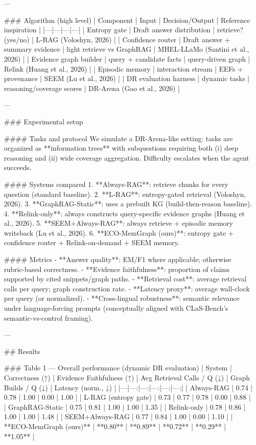 ---

### Algorithm (high level)
| Component | Input | Decision/Output | Reference inspiration |
|---|---|---|---|
| Entropy gate | Draft answer distribution | retrieve? (yes/no) | L-RAG (Voloshyn, 2026) |
| Confidence router | Draft answer + summary evidence | light retrieve vs GraphRAG | MHEL-LLaMo (Santini et al., 2026) |
| Evidence graph builder | query + candidate facts | query-driven graph | Relink (Huang et al., 2026) |
| Episodic memory | interaction stream | EEFs + provenance | SEEM (Lu et al., 2026) |
| DR evaluation harness | dynamic tasks | reasoning/coverage scores | DR-Arena (Gao et al., 2026) |

---

### Experimental setup  

#### Tasks and protocol  
We simulate a DR-Arena-like setting: tasks are organized as **information trees** with subquestions requiring both (i) deep reasoning and (ii) wide coverage aggregation. Difficulty escalates when the agent succeeds.

#### Systems compared  
1. **Always-RAG**: retrieve chunks for every question (standard baseline).  
2. **L-RAG**: entropy-gated retrieval (Voloshyn, 2026).  
3. **GraphRAG-Static**: uses a prebuilt KG (build-then-reason baseline).  
4. **Relink-only**: always constructs query-specific evidence graphs (Huang et al., 2026).  
5. **SEEM+Always-RAG**: always retrieve + episodic memory writeback (Lu et al., 2026).  
6. **ECO-MemGraph (ours)**: entropy gate + confidence router + Relink-on-demand + SEEM memory.

#### Metrics  
- **Answer quality**: EM/F1 where applicable; otherwise rubric-based correctness.  
- **Evidence faithfulness**: proportion of claims supported by cited snippets/graph paths.  
- **Retrieval cost**: average retrieval calls per query; graph construction rate.  
- **Latency proxy**: average wall-clock per query (or normalized).  
- **Cross-lingual robustness**: semantic relevance under language-forcing prompts (conceptually aligned with CLaS-Bench’s semantic-vs-control framing).

---

## Results  

### Table 1 — Overall performance (dynamic DR evaluation)
| System | Correctness (↑) | Evidence Faithfulness (↑) | Avg Retrieval Calls / Q (↓) | Graph Builds / Q (↓) | Latency (norm., ↓) |
|---|---:|---:|---:|---:|---:|
| Always-RAG | 0.74 | 0.78 | 1.00 | 0.00 | 1.00 |
| L-RAG (entropy gate) | 0.73 | 0.77 | 0.78 | 0.00 | 0.88 |
| GraphRAG-Static | 0.75 | 0.81 | 1.00 | 1.00 | 1.35 |
| Relink-only | 0.78 | 0.86 | 1.00 | 1.00 | 1.48 |
| SEEM+Always-RAG | 0.77 | 0.84 | 1.00 | 0.00 | 1.10 |
| **ECO-MemGraph (ours)** | **0.80** | **0.89** | **0.72** | **0.29** | **1.05** |

